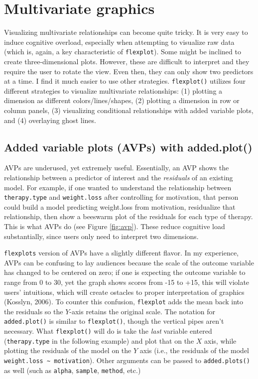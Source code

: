 \documentclass[
  man]{apa6}
\begin{document}
\hypertarget{multivariate-graphics}{%
\section{Multivariate graphics}\label{multivariate-graphics}}

Visualizing multivariate relationships can become quite tricky. It is very easy to induce cognitive overload, especially when attempting to visualize raw data (which is, again, a key characteristic of \texttt{flexplot}). Some might be inclined to create three-dimensional plots. However, these are difficult to interpret and they require the user to rotate the view. Even then, they can only show two predictors at a time. I find it much easier to use other strategies. \texttt{flexplot()} utilizes four different strategies to visualize multivariate relationships: (1) plotting a dimension as different colors/lines/shapes, (2) plotting a dimension in row or column panels, (3) visualizing conditional relationships with added variable plots, and (4) overlaying ghost lines.

\subsection[Added variable plots (AVPs) with added.plot()]{Added variable plots (AVPs) with added.plot()} \label{sec:added.plot}

AVPs are underused, yet extremely useful. Essentially, an AVP shows the relationship between a predictor of interest and the \emph{residuals} of an existing model. For example, if one wanted to understand the relationship between \texttt{therapy.type} and \texttt{weight.loss} after controlling for motivation, that person could build a model predicting weight.loss from motivation, residualize that relationship, then show a beeswarm plot of the residuals for each type of therapy. This is what AVPs do (see Figure \ref{fig:avp}). These reduce cognitive load substantially, since users only need to interpret two dimensions.

\texttt{flexplot\textquotesingle{}s} version of AVPs have a slightly different flavor. In my experience, AVPs can be confusing to lay audiences because the scale of the outcome variable has changed to be centered on zero; if one is expecting the outcome variable to range from 0 to 30, yet the graph shows scores from -15 to +15, this will violate users' intuitions, which will create ostacles to proper interpretation of graphics (Kosslyn, 2006). To counter this confusion, \texttt{flexplot} adds the mean back into the residuals so the \(Y\)-axis retains the original scale. The notation for \texttt{added.plot()} is similar to \texttt{flexplot()}, though the vertical pipes aren't necessary. What \texttt{flexplot()} will do is take the \emph{last} variable entered (\texttt{therapy.type} in the following example) and plot that on the \(X\) axis, while plotting the residuals of the model on the \(Y\) axis (i.e., the residuals of the model \texttt{weight.loss\ \textasciitilde{}\ motivation}). Other arguments can be passed to \texttt{added.plots()} as well (such as \texttt{alpha}, \texttt{sample}, \texttt{method}, etc.)
\end{document}
